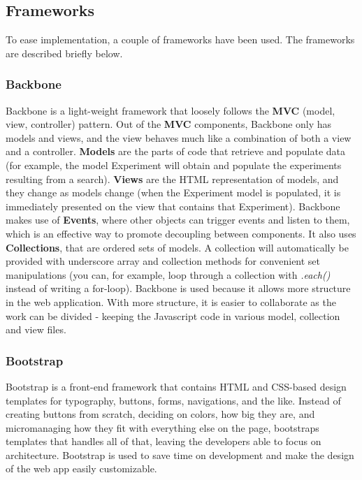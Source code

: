 

\subsection{Frameworks}
\label{sec:web_frame}
To ease implementation, a couple of frameworks have been used. The frameworks are described briefly below.
\subsubsection{Backbone}
Backbone\cite{web_1} is a light-weight framework that loosely follows the \textbf{MVC} (model, view, controller) pattern. Out of the \textbf{MVC} components, Backbone only has models and views, and the view behaves much like a combination of both a view and a controller. \textbf{Models} are the parts of code that retrieve and populate data (for example, the model Experiment will obtain and populate the experiments resulting from a search). \textbf{Views} are the HTML representation of models, and they change as models change (when the Experiment model is populated, it is immediately presented on the view that contains that Experiment).
Backbone makes use of \textbf{Events}, where other objects can trigger events and listen to them, which is an effective way to promote decoupling between components. It also uses \textbf{Collections}, that are ordered sets of models. A collection will automatically be provided with underscore array and collection methods for convenient set manipulations (you can, for example, loop through a collection with \textit{.each()} instead of writing a for-loop). Backbone is used because it allows more structure in the web application. With more structure, it is easier to collaborate as the work can be divided - keeping the Javascript code in various model, collection and view files.

\subsubsection{Bootstrap}
Bootstrap\cite{web_2} is a front-end framework that contains HTML and CSS-based design templates for typography, buttons, forms, navigations, and the like. Instead of creating buttons from scratch, deciding on colors, how big they are, and micromanaging how they fit with everything else on the page, bootstraps templates that handles all of that, leaving the developers able to focus on architecture. Bootstrap is used to save time on development and make the design of the web app easily customizable.

